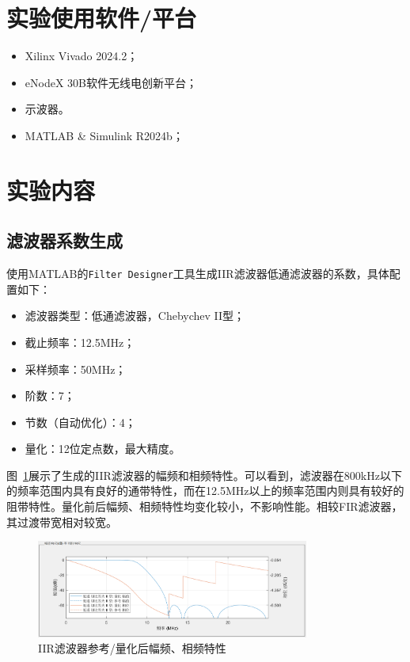 \section{实验使用软件/平台}
\begin{itemize}
    \item Xilinx Vivado 2024.2；
    \item eNodeX 30B软件无线电创新平台；
    \item 示波器。
    \item MATLAB \& Simulink R2024b；
  \end{itemize}
\section{实验内容}
\subsection{滤波器系数生成}
使用MATLAB的\texttt{Filter Designer}工具生成IIR滤波器低通滤波器的系数，具体配置如下：
\begin{itemize}
    \item 滤波器类型：低通滤波器，Chebychev II型；
    \item 截止频率：12.5MHz；
    \item 采样频率：50MHz；
    \item 阶数：7；
    \item 节数（自动优化）：4；
    \item 量化：12位定点数，最大精度。
\end{itemize}

图~\ref{fig:ex8:filter_coefficients}展示了生成的IIR滤波器的幅频和相频特性。可以看到，滤波器在800kHz以下的频率范围内具有良好的通带特性，而在12.5MHz以上的频率范围内则具有较好的阻带特性。量化前后幅频、相频特性均变化较小，不影响性能。相较FIR滤波器，其过渡带宽相对较宽。
\begin{figure}[htbp]
    \centering
    \includegraphics[width=0.8\textwidth]{figure/exp8/filterDesign.png}
    \caption{IIR滤波器参考/量化后幅频、相频特性}
    \label{fig:ex8:filter_coefficients}
\end{figure}

